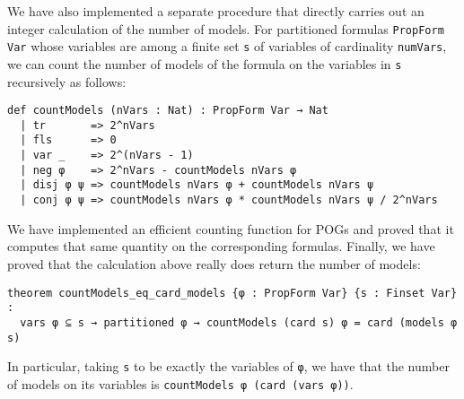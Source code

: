 We have also implemented a separate procedure that directly carries out an integer
calculation of the number of models.
For partitioned formulas \lstinline{PropForm Var} whose
variables are among a finite set \lstinline{s} of variables of cardinality \lstinline{numVars},
we can count the number of models of the formula on the variables in \lstinline{s}
recursively as follows:
\begin{lstlisting}
def countModels (nVars : Nat) : PropForm Var → Nat
  | tr       => 2^nVars
  | fls      => 0
  | var _    => 2^(nVars - 1)
  | neg φ    => 2^nVars - countModels nVars φ
  | disj φ ψ => countModels nVars φ + countModels nVars ψ
  | conj φ ψ => countModels nVars φ * countModels nVars ψ / 2^nVars
\end{lstlisting}
We have implemented an efficient counting function for POGs and proved that
it computes that same quantity on the corresponding formulas.
Finally,
we have proved that the calculation above really does
return the number of models:
\begin{lstlisting}
theorem countModels_eq_card_models {φ : PropForm Var} {s : Finset Var} :
  vars φ ⊆ s → partitioned φ → countModels (card s) φ = card (models φ s)
\end{lstlisting}
In particular, taking \lstinline{s} to be exactly the variables of \lstinline{φ},
we have that the number of models on its variables is \lstinline{countModels φ (card (vars φ))}.
